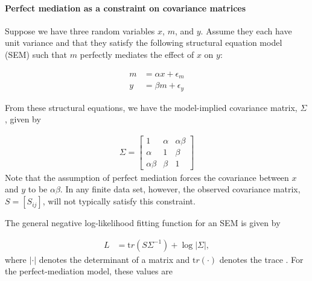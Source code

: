 \documentclass[
]{article}
\begin{document}
\paragraph{Perfect mediation as a constraint on covariance
matrices}\label{perfect-mediation-as-a-constraint-on-covariance-matrices}

Suppose we have three random variables \(x\), \(m\), and \(y\). Assume
they each have unit variance and that they satisfy the following
structural equation model (SEM) such that \(m\) perfectly mediates the
effect of \(x\) on \(y\):

\begin{align}
m &= \alpha x + \epsilon_m \label{eqn:perfect_mediation1}\\ 
y &= \beta m + \epsilon_y  \label{eqn:perfect_mediation2}
\end{align}

From these structural equations, we have the model-implied covariance
matrix, \(\Sigma\), given by

\begin{align}
\label{eqn:model_implied_covariance}
\Sigma = 
  \begin{bmatrix}
1 & \alpha & \alpha \beta \\
\alpha & 1 & \beta \\
\alpha \beta & \beta & 1
\end{bmatrix}
\end{align} Note that the assumption of perfect mediation forces the
covariance between \(x\) and \(y\) to be \(\alpha \beta\). In any finite
data set, however, the observed covariance matrix, \(S = [S_{ij}]\),
will not typically satisfy this constraint.

The general negative log-likelihood fitting function for an SEM is given
by

\begin{align}
\label{eq:loglikelihood}
L &= {\mathrm tr}\left(S \Sigma^{-1}\right) + \log\left|\Sigma\right|,
\end{align} where \(|\cdot|\) denotes the determinant of a matrix and
\({\mathrm tr}(\cdot)\) denotes the trace \cite{bollen2014structural}.
For the perfect-mediation model, these values are
\end{document}
